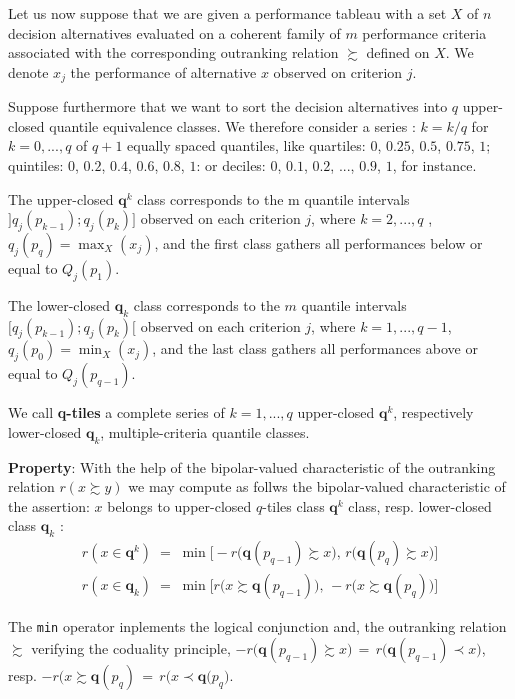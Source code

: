 Let us now suppose that we are given a performance tableau with a set $X$ of $n$ decision alternatives evaluated on a coherent family of $m$ performance criteria associated with the corresponding outranking relation $\succsim$ defined on $X$. We denote $x_j$ the performance of alternative $x$ observed on criterion $j$.

Suppose furthermore that we want to sort the decision alternatives into $q$ upper-closed quantile equivalence classes. We therefore consider a series : $k = k/q$ for $k = 0, ..., q$ of $q+1$ equally spaced quantiles, like quartiles: $0$, $0.25$, $0.5$, $0.75$, $1$; quintiles: $0$, $0.2$, $0.4$, $0.6$, $0.8$, $1$: or deciles: $0$, $0.1$, $0.2$, ..., $0.9$, $1$, for instance.

The upper-closed $\mathbf{q}^k$ class corresponds to the m quantile intervals $]q_j(p_{k-1});q_j(p_k)]$ observed on each criterion $j$,  where $k = 2, ..., q$ , $q_j(p_q) =  \max_X(x_j)$, and the first class gathers all performances below or equal to $Q_j(p_1)$.

The lower-closed $\mathbf{q}_k$ class corresponds to the $m$ quantile intervals $[q_j(p_{k-1});q_j(p_k)[$ observed on each criterion $j$, where $k = 1, ..., q-1$, $q_j(p_0) = \min_X(x_j)$, and the last class gathers all performances above or equal to $Q_j(p_{q-1})$.

We call \textbf{q-tiles} a complete series of $k = 1, ..., q$ upper-closed $\mathbf{q}^k$, respectively lower-closed $\mathbf{q}_k$, multiple-criteria quantile classes.

\textbf{Property}: With the help of the bipolar-valued characteristic of the outranking relation $r(x \succsim y)$ we may compute as follws the bipolar-valued characteristic of the assertion: $x$ belongs to upper-closed $q$-tiles class $\mathbf{q}^k$ class, resp. lower-closed class $\mathbf{q}_k$ \citep{ADT-L10}:
\begin{eqnarray}\label{eq:9.1}
r(x \in \mathbf{q}^k) \; = \; \min \big[ -r\big(\mathbf{q}(p_{q-1}) \succsim x\big), \,r\big(\mathbf{q}(p_{q}) \succsim x)\big]\\
r(x \in \mathbf{q}_k) \; = \; \min \big[ r\big(x \succsim \mathbf{q}(p_{q-1})\big),\, -r\big(x \succsim\mathbf{q}(p_{q})\big)\big]
\end{eqnarray}

The \texttt{min} operator inplements the logical conjunction and, the outranking relation $\succsim$ verifying the coduality principle, $-r\big(\mathbf{q}(p_{q-1}) \succsim x\big) \,=\, r\big(\mathbf{q}(p_{q-1}) \prec x\big)$, resp. $-r\big(x \succsim \mathbf{q}(p_{q}) \,=\, r\big(x \prec \mathbf{q}(p_{q}\big)$.

